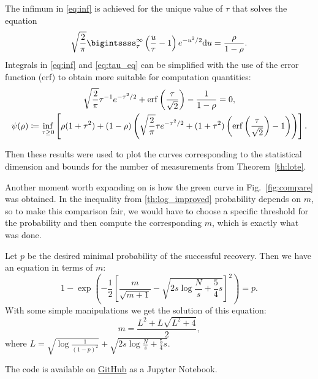 The infimum in \ref{eq:inf} is achieved for the unique value of $\tau$ that solves the equation
\begin{equation} \label{eq:tau_eq}
    \sqrt{\frac{2}{\pi}}\bigintssss_{\tau}^{\infty} \left( \frac{u}{\tau} - 1 \right) e^{-u^2/2} \mathrm{d} u = \frac{\rho}{1 - \rho}.
\end{equation}
Integrals in \ref{eq:inf} and \ref{eq:tau_eq} can be simplified with the use of the error function (erf) to obtain more suitable
for computation quantities:
    \begin{gather}
        \sqrt{\frac{2}{\pi}}\tau^{-1}e^{-\tau^2/2} + \operatorname{erf}\left( \frac{\tau}{\sqrt{2}} \right) - \frac{1}{1-\rho} = 0,
        \\
        \psi(\rho) \coloneq \inf_{\tau \geq 0} \left[ \rho (1+\tau^2) +
        (1-\rho) \left( \sqrt{\frac{2}{\pi}} \tau e^{-\tau^2/2} + (1+\tau^2)\left(\mathrm{erf}\left(\frac{\tau}{\sqrt{2}}\right) - 1\right) \right) \right].
    \end{gather}

Then these results were used to plot the curves corresponding to the statistical dimension and
bounds for the number of measurements from Theorem~\ref{th:lote}.

Another moment worth expanding on is how the green curve in Fig.~\ref{fig:compare} was obtained.
In the inequality from \ref{th:log_improved} probability depends on $m$, so to make this comparison fair,
we would have to choose a specific threshold for the probability and then compute the corresponding $m$, which is
exactly what was done.

Let $p$ be the desired minimal probability of the successful recovery.
Then we have an equation in terms of $m$:
\[ 1 - \exp \left( - \frac{1}{2} \left[\frac{m}{\sqrt{m+1}} - \sqrt {2s \log \frac{N}{s}+\frac{5}{4}s}\right]^2 \right) = p.\]
With some simple manipulations we get the solution of this equation:
\[ m = \frac{L^2 + L\sqrt{L^2 + 4}}{2}, \]
where $L = \sqrt{\log \frac{1}{(1-p)^2}} + \sqrt {2s \log \frac{N}{s}+\frac{5}{4}s}$.

The code is available on \href{https://github.com/anastorr/compressed-sensing}{GitHub} as a Jupyter Notebook.